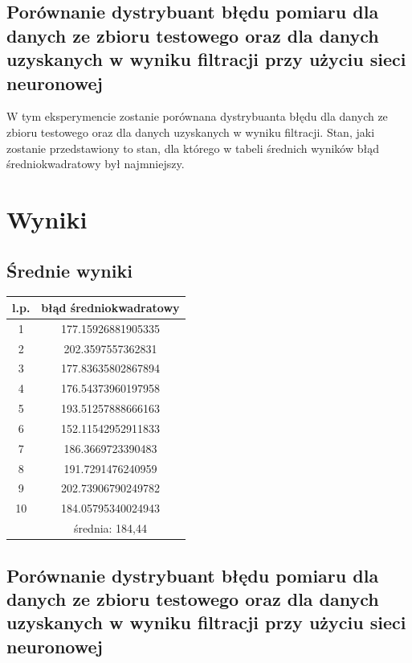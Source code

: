 \documentclass{classrep}
\begin{document}
\subsection{Porównanie dystrybuant błędu pomiaru dla danych ze zbioru testowego oraz dla danych uzyskanych w wyniku filtracji przy użyciu sieci neuronowej}
W tym eksperymencie zostanie porównana dystrybuanta błędu dla danych ze zbioru testowego oraz dla danych uzyskanych w wyniku filtracji. Stan, jaki zostanie przedstawiony to stan, dla którego w tabeli średnich wyników błąd średniokwadratowy był najmniejszy.


\section{Wyniki}

\subsection{Średnie wyniki}

\begin{center}
	\begin{tabular}{c c} 
		\hline
		l.p. & błąd średniokwadratowy \\ [0.5ex] 
		\hline\hline
		1 & 177.15926881905335  \\ 
		2 & 202.3597557362831 \\
		3 & 177.83635802867894 \\
		4 & 176.54373960197958 \\
		5 & 193.51257888666163  \\
		6 & 152.11542952911833  \\
		7 & 186.3669723390483  \\
		8 & 191.7291476240959  \\
		9 & 202.73906790249782  \\
		10 & 184.05795340024943  \\
		\hline
		\hline
		 &średnia: 184,44  \\		
		\hline
	\end{tabular}
\end{center}

\newpage
\subsection{Porównanie dystrybuant błędu pomiaru dla danych ze zbioru testowego oraz dla danych uzyskanych w wyniku filtracji przy użyciu sieci neuronowej}
\end{document}
